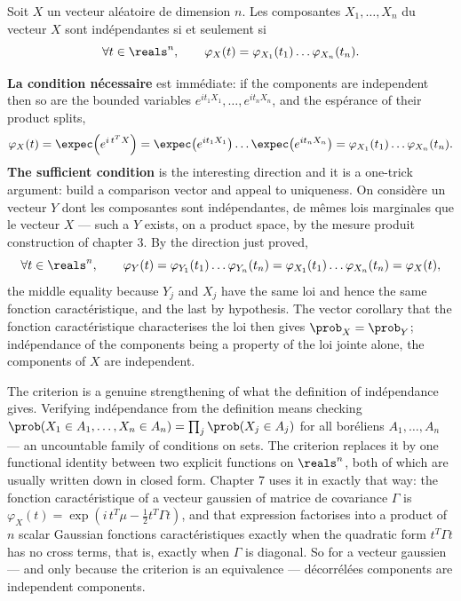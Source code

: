 \begin{prop}
Soit $X$ un vecteur aléatoire de dimension $n$. Les composantes $X_{1},\dots,X_{n}$ du vecteur
$X$ sont indépendantes si et seulement si
\[
  \forall t \in \reals^{n}, \qquad \varphi_{X}(t) = \varphi_{X_{1}}(t_{1}) \dots
  \varphi_{X_{n}}(t_{n}).
\]
\end{prop}

\begin{remark}
\textbf{La condition nécessaire} est immédiate: if the components are independent then so are
the bounded variables $e^{it_{1}X_{1}},\dots,e^{it_{n}X_{n}}$, and the espérance of their
product splits,
\[
  \varphi_{X}(t) = \expec\!\left(e^{i\,t^{T}X}\right) =
  \expec\!\left(e^{it_{1}X_{1}}\right)\dots\expec\!\left(e^{it_{n}X_{n}}\right) =
  \varphi_{X_{1}}(t_{1})\dots\varphi_{X_{n}}(t_{n}).
\]
\textbf{The sufficient condition} is the interesting direction and it is a one-trick
argument: build a comparison vector and appeal to uniqueness. On considère un vecteur $Y$
dont les composantes sont indépendantes, de mêmes lois marginales que le vecteur $X$ --- such a
$Y$ exists, on a product space, by the mesure produit construction of chapter 3. By the
direction just proved,
\[
  \forall t \in \reals^{n}, \qquad \varphi_{Y}(t) =
  \varphi_{Y_{1}}(t_{1})\dots\varphi_{Y_{n}}(t_{n}) =
  \varphi_{X_{1}}(t_{1})\dots\varphi_{X_{n}}(t_{n}) = \varphi_{X}(t),
\]
the middle equality because $Y_{j}$ and $X_{j}$ have the same loi and hence the same
fonction caractéristique, and the last by hypothesis. The vector corollary that the
fonction caractéristique characterises the loi then gives $\prob_{X} = \prob_{Y}$;
indépendance of the components being a property of the loi jointe alone, the components of
$X$ are independent.
\end{remark}

\begin{remark}
The criterion is a genuine strengthening of what the definition of indépendance gives.
Verifying indépendance from the definition means checking $\prob(X_{1} \in A_{1}, \dots,
X_{n} \in A_{n}) = \prod_{j}\prob(X_{j} \in A_{j})$ for all boréliens $A_{1},\dots,A_{n}$ ---
an uncountable family of conditions on sets. The criterion replaces it by one functional
identity between two explicit functions on $\reals^{n}$, both of which are usually written
down in closed form. Chapter 7 uses it in exactly that way: the fonction caractéristique of a
vecteur gaussien of matrice de covariance $\Gamma$ is $\varphi_{X}(t) =
\exp\!\left(i\,t^{T}\mu - \tfrac{1}{2}t^{T}\Gamma t\right)$, and that
expression factorises into a product of $n$ scalar Gaussian fonctions caractéristiques exactly
when the quadratic form $t^{T}\Gamma t$ has no cross terms, that is, exactly when
$\Gamma$ is diagonal. So for a vecteur gaussien --- and only because the criterion is an
equivalence --- décorrélées components are independent components.
\end{remark}

